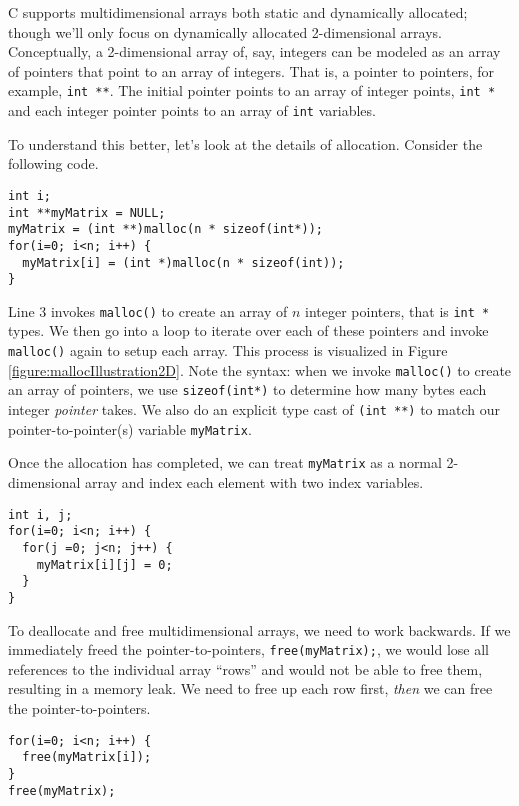 C supports multidimensional arrays both static and dynamically
allocated; though we'll only focus on dynamically allocated 2-dimensional
arrays.  Conceptually, a 2-dimensional array of, say, integers can
be modeled as an array of pointers that point to an array of integers.
That is, a pointer to pointers, for example, \texttt{int **}.  
The initial pointer points to an array of integer points, \texttt{int *}
and each integer pointer points to an array of \texttt{int} variables.

To understand this better, let's look at the details of allocation.  Consider
the following code.

\begin{verbatim}
int i;
int **myMatrix = NULL; 
myMatrix = (int **)malloc(n * sizeof(int*)); 
for(i=0; i<n; i++) {
  myMatrix[i] = (int *)malloc(n * sizeof(int)); 
}
\end{verbatim}

Line 3 invokes \texttt{malloc()} to create an array of $n$ integer
pointers, that is \texttt{int *} types.  We then go into a loop to
iterate over each of these pointers and invoke \texttt{malloc()} 
again to setup each array.  This process is visualized in Figure 
\ref{figure:mallocIllustration2D}.  Note the syntax: when we invoke \texttt{malloc()} to 
create an array of pointers, we use \texttt{sizeof(int*)} to
determine how many bytes each integer \emph{pointer} takes.  We
also do an explicit type cast of \texttt{(int **)} to match our
pointer-to-pointer(s) variable \texttt{myMatrix}.  



Once the allocation has completed, we can treat \texttt{myMatrix}
as a normal 2-dimensional array and index each element with two
index variables.

\begin{verbatim}
int i, j;
for(i=0; i<n; i++) {
  for(j =0; j<n; j++) {
    myMatrix[i][j] = 0;
  }
}
\end{verbatim}

To deallocate and free multidimensional arrays, we need to work backwards.
If we immediately freed the pointer-to-pointers, \texttt{free(myMatrix);}, 
we would lose all references to the individual array ``rows'' and would not
be able to free them, resulting in a \gls{memory leak}.  We need to free up 
each row first, \emph{then} we can free the pointer-to-pointers.

\begin{verbatim}
for(i=0; i<n; i++) {
  free(myMatrix[i]);
}
free(myMatrix);
\end{verbatim}

